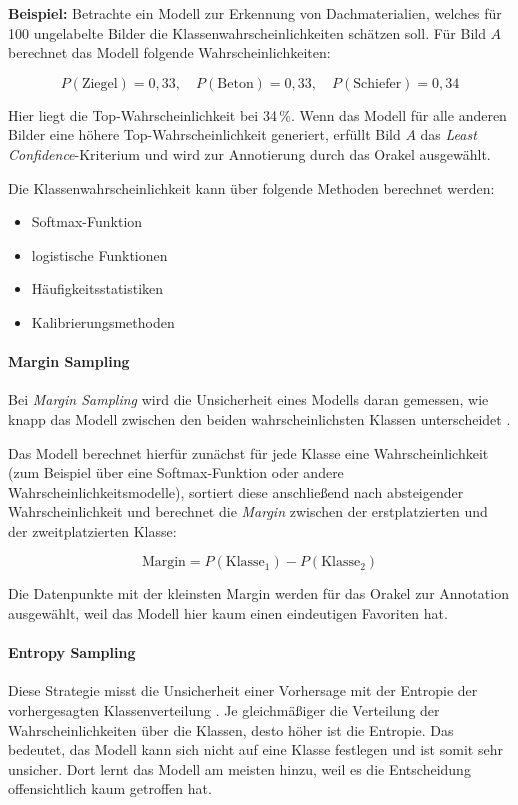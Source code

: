 \documentclass{article}
\begin{document}
	\textbf{Beispiel:}  
	Betrachte ein Modell zur Erkennung von Dachmaterialien, welches für 100 ungelabelte Bilder die Klassenwahrscheinlichkeiten schätzen soll. Für Bild $A$ berechnet das Modell folgende Wahrscheinlichkeiten:
	
	\begin{equation}
		P(\mathrm{Ziegel}) = 0{,}33,\quad P(\mathrm{Beton}) = 0{,}33,\quad P(\mathrm{Schiefer}) = 0{,}34
	\end{equation}
	
	Hier liegt die Top-Wahrscheinlichkeit bei 34\,\%. Wenn das Modell für alle anderen Bilder eine höhere Top-Wahrscheinlichkeit generiert, erfüllt Bild $A$ das \textit{Least Confidence}-Kriterium und wird zur Annotierung durch das Orakel ausgewählt.
	
	Die Klassenwahrscheinlichkeit kann über folgende Methoden berechnet werden:
	\begin{itemize}
		\item Softmax-Funktion
		\item logistische Funktionen
		\item Häufigkeitsstatistiken
		\item Kalibrierungsmethoden
	\end{itemize}
	
	\paragraph{Margin Sampling}
	Bei \textit{Margin Sampling} wird die Unsicherheit eines Modells daran gemessen, wie knapp das Modell zwischen den beiden wahrscheinlichsten Klassen unterscheidet \cite{Scheffer2001}.
	
	Das Modell berechnet hierfür zunächst für jede Klasse eine Wahrscheinlichkeit (zum Beispiel über eine Softmax-Funktion oder andere Wahrscheinlichkeitsmodelle), sortiert diese anschließend nach absteigender Wahrscheinlichkeit und berechnet die \textit{Margin} zwischen der erstplatzierten und der zweitplatzierten Klasse:
	
	\begin{equation}
		\text{Margin} = P(\text{Klasse}_1) - P(\text{Klasse}_2)
	\end{equation}
	
	Die Datenpunkte mit der kleinsten Margin werden für das Orakel zur Annotation ausgewählt, weil das Modell hier kaum einen eindeutigen Favoriten hat.
	
	
	\paragraph{Entropy Sampling}
	Diese Strategie misst die Unsicherheit einer Vorhersage mit der Entropie der vorhergesagten Klassenverteilung \cite{Joshi2009}. Je gleichmäßiger die Verteilung der Wahrscheinlichkeiten über die Klassen, desto höher ist die Entropie. Das bedeutet, das Modell kann sich nicht auf eine Klasse festlegen und ist somit sehr unsicher. Dort lernt das Modell am meisten hinzu, weil es die Entscheidung offensichtlich kaum getroffen hat.
	
\end{document}
